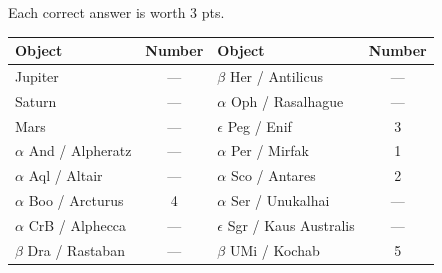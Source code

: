 Each correct answer is worth 3 pts.

\begin{center}
\begin{tabular}{lc|lc}
Object & Number & Object & Number \\
\hline
Jupiter & --- & $\beta$ Her / Antilicus & --- \\
Saturn & --- & $\alpha$ Oph / Rasalhague & --- \\
Mars & --- & $\epsilon$ Peg / Enif & 3 \\
$\alpha$ And / Alpheratz & --- & $\alpha$ Per / Mirfak & 1 \\
$\alpha$ Aql / Altair & --- & $\alpha$ Sco / Antares & 2 \\
$\alpha$ Boo / Arcturus & 4 & $\alpha$ Ser / Unukalhai & --- \\
$\alpha$ CrB / Alphecca & --- & $\epsilon$ Sgr / Kaus Australis & --- \\
$\beta$ Dra / Rastaban & --- & $\beta$ UMi / Kochab & 5 \\
\end{tabular}
\end{center}
